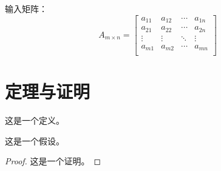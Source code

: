 输入矩阵：
\begin{equation}
	\label{eqn:matrix}
	A_{m\times n}=
	\left[ {\begin{array}{cccc}
			a_{11} & a_{12} & \cdots & a_{1n}\\
			a_{21} & a_{22} & \cdots & a_{2n}\\
			\vdots & \vdots & \ddots & \vdots\\
			a_{m1} & a_{m2} & \cdots & a_{mn}\\
	\end{array}}\right]
\end{equation}

\section{定理与证明}
\label{sec:theorem}
\begin{definition}
	这是一个定义。
\end{definition}

\begin{assumption}
	这是一个假设。
\end{assumption}

\begin{proof}
	这是一个证明。
\end{proof}
